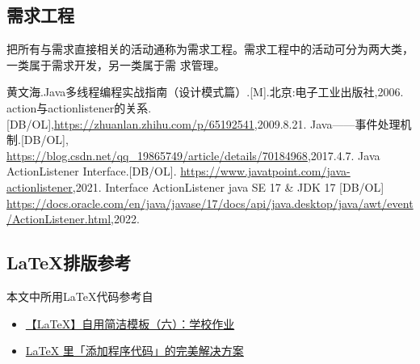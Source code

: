 \documentclass[12pt, a4paper, oneside]{ctexart}
\begin{document}
\subsection{需求工程}

把所有与需求直接相关的活动通称为需求工程。需求工程中的活动可分为两大类，一类属于需求开发，另一类属于需
求管理。

\newpage

\begin{thebibliography}{99}
    黄文海.Java多线程编程实战指南（设计模式篇）.[M].北京:电子工业出版社,2006.
    action与actionlistener的关系.[DB/OL],\newline \url{https://zhuanlan.zhihu.com/p/65192541},2009.8.21.
    Java——事件处理机制.[DB/OL],
        \newline \url{https://blog.csdn.net/qq_19865749/article/details/70184968},2017.4.7.
    Java ActionListener Interface.[DB/OL].
        \newline \url{https://www.javatpoint.com/java-actionlistener},2021.
    Interface ActionListener java SE 17 \& JDK 17 [DB/OL]\newline
        \url{https://docs.oracle.com/en/java/javase/17/docs/api/java.desktop/java/awt/event/ActionListener.html},2022.
\end{thebibliography}


\newpage

\begin{appendices}
    \renewcommand{\thesection}{\Alph{section}}
    \section{\LaTeX 排版参考}
        本文中所用\LaTeX 代码参考自
        \begin{itemize}
            \item  \href{https://zhuanlan.zhihu.com/p/385727082}{【LaTeX】自用简洁模板（六）：学校作业} 
            \item  \href{https://zhuanlan.zhihu.com/p/65441079}{LaTeX 里「添加程序代码」的完美解决方案}
        \end{itemize}
\end{appendices}
\end{document}
